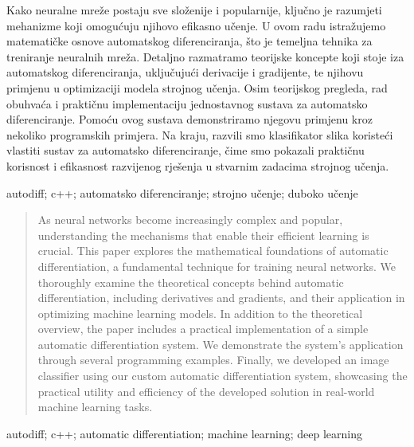 \documentclass[zavrsnirad]{fer}
\begin{document}






\begin{sazetak}
Kako neuralne mreže postaju sve složenije i popularnije, ključno je razumjeti mehanizme koji omogućuju njihovo efikasno učenje. U ovom radu istražujemo matematičke osnove automatskog diferenciranja, što je temeljna tehnika za treniranje neuralnih mreža. Detaljno razmatramo teorijske koncepte koji stoje iza automatskog diferenciranja, uključujući derivacije i gradijente, te njihovu primjenu u optimizaciji modela strojnog učenja. Osim teorijskog pregleda, rad obuhvaća i praktičnu implementaciju jednostavnog sustava za automatsko diferenciranje. Pomoću ovog sustava demonstriramo njegovu primjenu kroz nekoliko programskih primjera. Na kraju, razvili smo klasifikator slika koristeći vlastiti sustav za automatsko diferenciranje, čime smo pokazali praktičnu korisnost i efikasnost razvijenog rješenja u stvarnim zadacima strojnog učenja.
\end{sazetak}

\begin{kljucnerijeci}
  autodiff; c++; automatsko diferenciranje; strojno učenje; duboko učenje
\end{kljucnerijeci}


\begin{abstract}
As neural networks become increasingly complex and popular, understanding the mechanisms that enable their efficient learning is crucial. This paper explores the mathematical foundations of automatic differentiation, a fundamental technique for training neural networks. We thoroughly examine the theoretical concepts behind automatic differentiation, including derivatives and gradients, and their application in optimizing machine learning models. In addition to the theoretical overview, the paper includes a practical implementation of a simple automatic differentiation system. We demonstrate the system's application through several programming examples. Finally, we developed an image classifier using our custom automatic differentiation system, showcasing the practical utility and efficiency of the developed solution in real-world machine learning tasks.
\end{abstract}

\begin{keywords}
  autodiff; c++; automatic differentiation; machine learning; deep learning
\end{keywords}



\backmatter
\end{document}
